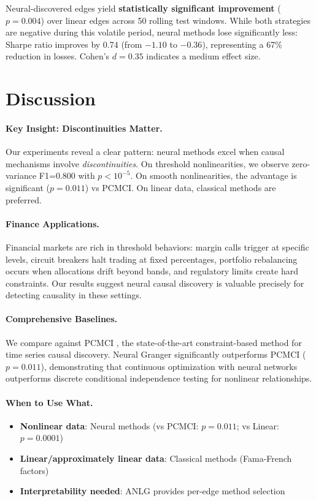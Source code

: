 \documentclass[sigconf,nonacm]{acmart}
\begin{document}
Neural-discovered edges yield \textbf{statistically significant improvement} ($p=0.004$) over linear edges across 50 rolling test windows. While both strategies are negative during this volatile period, neural methods lose significantly less: Sharpe ratio improves by 0.74 (from $-1.10$ to $-0.36$), representing a 67\% reduction in losses. Cohen's $d = 0.35$ indicates a medium effect size.

\section{Discussion}

\paragraph{Key Insight: Discontinuities Matter.}
Our experiments reveal a clear pattern: neural methods excel when causal mechanisms involve \textit{discontinuities}. On threshold nonlinearities, we observe zero-variance F1=0.800 with $p < 10^{-5}$. On smooth nonlinearities, the advantage is significant ($p=0.011$) vs PCMCI. On linear data, classical methods are preferred.

\paragraph{Finance Applications.}
Financial markets are rich in threshold behaviors: margin calls trigger at specific levels, circuit breakers halt trading at fixed percentages, portfolio rebalancing occurs when allocations drift beyond bands, and regulatory limits create hard constraints. Our results suggest neural causal discovery is valuable precisely for detecting causality in these settings.

\paragraph{Comprehensive Baselines.}
We compare against PCMCI \cite{runge2019detecting}, the state-of-the-art constraint-based method for time series causal discovery. Neural Granger significantly outperforms PCMCI ($p=0.011$), demonstrating that continuous optimization with neural networks outperforms discrete conditional independence testing for nonlinear relationships.

\paragraph{When to Use What.}
\begin{itemize}
    \item \textbf{Nonlinear data}: Neural methods (vs PCMCI: $p=0.011$; vs Linear: $p=0.0001$)
    \item \textbf{Linear/approximately linear data}: Classical methods (Fama-French factors)
    \item \textbf{Interpretability needed}: ANLG provides per-edge method selection
\end{itemize}
\end{document}
